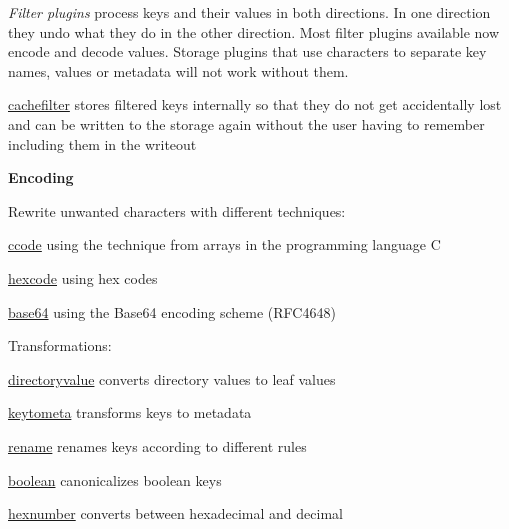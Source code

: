 {\itshape Filter plugins} process keys and their values in both directions. In one direction they undo what they do in the other direction. Most filter plugins available now encode and decode values. Storage plugins that use characters to separate key names, values or metadata will not work without them.


\begin{DoxyItemize}
\item \hyperlink{md_src_plugins_cachefilter_README_src_plugins_cachefilter_README_md}{cachefilter} stores filtered keys internally so that they do not get accidentally lost and can be written to the storage again without the user having to remember including them in the writeout
\end{DoxyItemize}

{\bfseries Encoding}

Rewrite unwanted characters with different techniques\+:


\begin{DoxyItemize}
\item \hyperlink{md_src_plugins_ccode_README_src_plugins_ccode_README_md}{ccode} using the technique from arrays in the programming language C
\item \hyperlink{md_src_plugins_hexcode_README_src_plugins_hexcode_README_md}{hexcode} using hex codes
\item \hyperlink{md_src_plugins_base64_README_src_plugins_base64_README_md}{base64} using the Base64 encoding scheme (R\+F\+C4648)
\end{DoxyItemize}

Transformations\+:


\begin{DoxyItemize}
\item \hyperlink{md_src_plugins_directoryvalue_README_src_plugins_directoryvalue_README_md}{directoryvalue} converts directory values to leaf values
\item \hyperlink{md_src_plugins_keytometa_README_src_plugins_keytometa_README_md}{keytometa} transforms keys to metadata
\item \hyperlink{md_src_plugins_rename_README_src_plugins_rename_README_md}{rename} renames keys according to different rules
\item \hyperlink{md_src_plugins_boolean_README_src_plugins_boolean_README_md}{boolean} canonicalizes boolean keys
\item \hyperlink{md_src_plugins_hexnumber_README_src_plugins_hexnumber_README_md}{hexnumber} converts between hexadecimal and decimal
\end{DoxyItemize}

